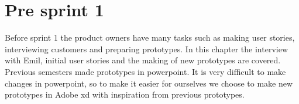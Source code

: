 \chapter{Pre sprint 1}
Before sprint 1 the product owners have many tasks such as making user stories, interviewing customers and preparing prototypes.
In this chapter the interview with Emil, initial user stories and the making of new prototypes are covered.
Previous semesters made prototypes in powerpoint. It is very difficult to make changes in powerpoint, so to make it easier for ourselves we choose to make new prototypes in Adobe xd with inspiration from previous prototypes.



